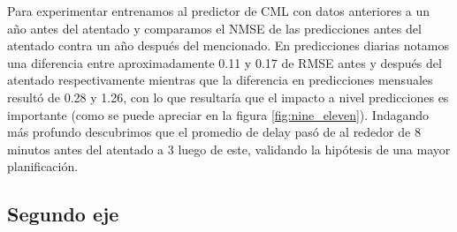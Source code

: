 Para experimentar entrenamos al predictor de CML con datos anteriores a un año antes del atentado y comparamos el NMSE de las predicciones antes del atentado contra un año después del mencionado. En predicciones diarias notamos una diferencia entre aproximadamente 0.11 y 0.17 de RMSE antes y después del atentado respectivamente mientras que la diferencia en predicciones mensuales resultó de 0.28 y 1.26, con lo que resultaría que el impacto a nivel predicciones es importante (como se puede apreciar en la figura \ref{fig:nine_eleven}). Indagando más profundo descubrimos que el promedio de delay pasó de al rededor de 8 minutos antes del atentado a 3 luego de este, validando la hipótesis de una mayor planificación.

\subsection{Segundo eje}

